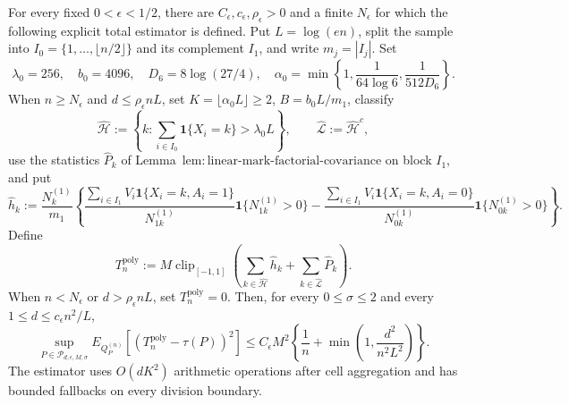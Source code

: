 For every fixed \(0<\epsilon<1/2\), there are \(C_{\epsilon},c_{\epsilon},\rho_{\epsilon}>0\) and a finite \(N_{\epsilon}\) for which the following explicit total estimator is defined.  Put \(L=\log(en)\), split the sample into \(I_0=\{1,\ldots,\lfloor n/2\rfloor\}\) and its complement \(I_1\), and write \(m_j=|I_j|\).  Set
\[
 \lambda_0=256,\quad b_0=4096,\quad D_6=8\log(27/4),\quad
 \alpha_0=\min\left\{1,\frac1{64\log6},\frac1{512D_6}\right\}.
\]
When \(n\ge N_{\epsilon}\) and \(d\le\rho_{\epsilon}nL\), set \(K=\lfloor\alpha_0L\rfloor\ge2\), \(B=b_0L/m_1\), classify
\[
 \widehat{\mathcal H}:=\left\{k:\sum_{i\in I_0}\mathbf 1\{X_i=k\}>\lambda_0L\right\},
 \qquad \widehat{\mathcal L}:=\widehat{\mathcal H}^{c},
\]
use the statistics \(\widehat P_k\) of Lemma~\(\mathrm{lem:linear\text{-}mark\text{-}factorial\text{-}covariance}\) on block \(I_1\), and put
\[
 \widehat h_k:=\frac{N_k^{(1)}}{m_1}\left\{
 \frac{\sum_{i\in I_1}V_i\mathbf 1\{X_i=k,A_i=1\}}{N_{1k}^{(1)}}\mathbf 1\{N_{1k}^{(1)}>0\}
 -\frac{\sum_{i\in I_1}V_i\mathbf 1\{X_i=k,A_i=0\}}{N_{0k}^{(1)}}\mathbf 1\{N_{0k}^{(1)}>0\}
 \right\}.
\]
Define
\[
 T_n^{\mathrm{poly}}:=M\operatorname{clip}_{[-1,1]}\!\left(
 \sum_{k\in\widehat{\mathcal H}}\widehat h_k+
 \sum_{k\in\widehat{\mathcal L}}\widehat P_k\right).
\]
When \(n<N_{\epsilon}\) or \(d>\rho_{\epsilon}nL\), set \(T_n^{\mathrm{poly}}=0\).  Then, for every \(0\le\sigma\le2\) and every \(1\le d\le c_{\epsilon}n^2/L\),
\[
 \sup_{P\in\mathcal P_{d,\epsilon,M,\sigma}}
 E_{Q_P^{(n)}}[(T_n^{\mathrm{poly}}-\tau(P))^2]
 \le C_{\epsilon}M^2\left\{\frac1n+\min\left(1,\frac{d^2}{n^2L^2}\right)\right\}.
\]
The estimator uses \(O(dK^2)\) arithmetic operations after cell aggregation and has bounded fallbacks on every division boundary.